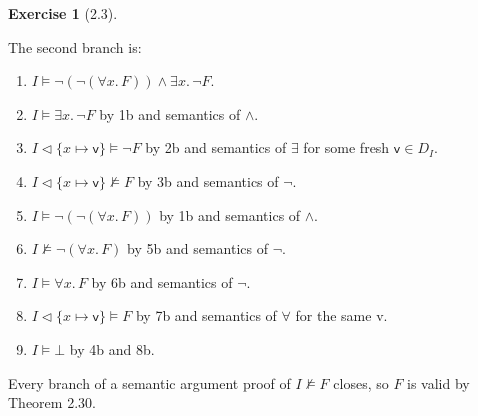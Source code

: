 \documentclass[12pt, psamsfonts]{amsart}
\theoremstyle{definition}
\newtheorem*{exer}{Exercise}
\theoremstyle{remark}
\numberwithin{equation}{subsection}
\begin{document}
\begin{exer}[2.3]
\begin{enumerate}[label=(\alph*)]
            The second branch is:
            \begin{enumerate}[label=\arabic*b.]
                \item %
                    $I \models \neg(\neg(\forall x.\, F)) \land \exists x.\, \neg F$.
                \item %
                    $I \models \exists x.\, \neg F$ by 1b and semantics of $\land$.
                \item %
                    $I \vartriangleleft \{ x \mapsto \textsf{v} \} \models \neg F$ by 2b and semantics of $\exists$ for some fresh $\textsf{v} \in D_I$.
                \item %
                    $I \vartriangleleft \{ x \mapsto \textsf{v} \} \not\models F$ by 3b and semantics of $\neg$.
                \item %
                    $I \models \neg(\neg(\forall x.\, F))$ by 1b and semantics of $\land$.
                \item %
                    $I \not\models \neg(\forall x.\, F)$ by 5b and semantics of $\neg$.
                \item %
                    $I \models \forall x.\, F$ by 6b and semantics of $\neg$.
                \item %
                    $I \vartriangleleft \{ x \mapsto \textsf{v} \} \models F$ by 7b and semantics of $\forall$ for the same \textsf{v}.
                \item %
                    $I \models \bot$ by 4b and 8b.
            \end{enumerate}

            Every branch of a semantic argument proof of $I \not\models F$ closes, so $F$ is valid by Theorem 2.30.
    \end{enumerate}
\end{exer}
\end{document}
